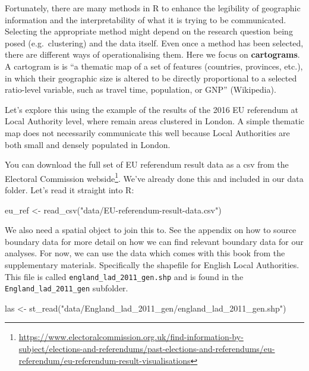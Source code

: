 \documentclass[
]{book}
\makeatletter
\newenvironment{Shaded}{\begin{snugshade}}{\end{snugshade}}
\newcommand{\FunctionTok}[1]{\textcolor[rgb]{0,0,0}{#1}}
\newcommand{\NormalTok}[1]{#1}
\newcommand{\OtherTok}[1]{\textcolor[rgb]{0.37,0.37,0.37}{#1}}
\newcommand{\StringTok}[1]{\textcolor[rgb]{0.5,0.5,0.5}{#1}}
\renewcommand{\href}[2]{#2\footnote{\url{#1}}}
\newenvironment{kframe}{%
\medskip{}
\setlength{\fboxsep}{.8em}
 \def\at@end@of@kframe{}%
 \ifinner\ifhmode%
  \def\at@end@of@kframe{\end{minipage}}%
  \begin{minipage}{\columnwidth}%
 \fi\fi%
 \def\FrameCommand##1{\hskip\@totalleftmargin \hskip-\fboxsep
 \colorbox{shadecolor}{##1}\hskip-\fboxsep
     \hskip-\linewidth \hskip-\@totalleftmargin \hskip\columnwidth}%
 \MakeFramed {\advance\hsize-\width
   \@totalleftmargin\z@ \linewidth\hsize
   \@setminipage}}%
 {\par\unskip\endMakeFramed%
 \at@end@of@kframe}
\renewenvironment{Shaded}{\begin{kframe}}{\end{kframe}}
\makeatother
\begin{document}
Fortunately, there are many methods in R to enhance the legibility of geographic information and the interpretability of what it is trying to be communicated. Selecting the appropriate method might depend on the research question being posed (e.g.~clustering) and the data itself. Even once a method has been selected, there are different ways of operationalising them. Here we focus on \textbf{cartograms}. A cartogram is is ``a thematic map of a set of features (countries, provinces, etc.), in which their geographic size is altered to be directly proportional to a selected ratio-level variable, such as travel time, population, or GNP'' (Wikipedia).

Let's explore this using the example of the results of the 2016 EU referendum at Local Authority level, where remain areas clustered in London. A simple thematic map does not necessarily communicate this well because Local Authorities are both small and densely populated in London.

You can download the full set of EU referendum result data as a csv from \href{https://www.electoralcommission.org.uk/find-information-by-subject/elections-and-referendums/past-elections-and-referendums/eu-referendum/eu-referendum-result-visualisations}{the Electoral Commission webside}. We've already done this and included in our data folder. Let's read it straight into R:

\begin{Shaded}
\begin{Highlighting}[]
\NormalTok{eu\_ref }\OtherTok{\textless{}{-}} \FunctionTok{read\_csv}\NormalTok{(}\StringTok{"data/EU{-}referendum{-}result{-}data.csv"}\NormalTok{)}
\end{Highlighting}
\end{Shaded}

We also need a spatial object to join this to. See the appendix on how to source boundary data for more detail on how we can find relevant boundary data for our analyses. For now, we can use the data which comes with this book from the supplementary materials. Specifically the shapefile for English Local Authorities. This file is called \texttt{england\_lad\_2011\_gen.shp} and is found in the \texttt{England\_lad\_2011\_gen} subfolder.

\begin{Shaded}
\begin{Highlighting}[]
\NormalTok{las }\OtherTok{\textless{}{-}} \FunctionTok{st\_read}\NormalTok{(}\StringTok{"data/England\_lad\_2011\_gen/england\_lad\_2011\_gen.shp"}\NormalTok{)}
\end{Highlighting}
\end{Shaded}
\end{document}
